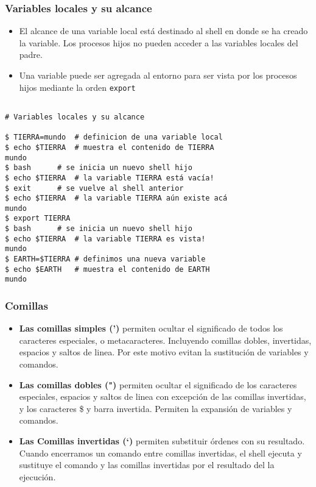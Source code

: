 \documentclass{beamer}
\begin{document}
\begin{frame}{}
\frametitle{Variables locales y su alcance}
\begin{itemize}
\item El alcance de una variable local está destinado al shell en donde se ha creado la variable. Los procesos hijos no pueden acceder a las variables locales del padre.
\item Una variable puede ser agregada al entorno para ser vista por los procesos hijos mediante la orden \texttt{export}
\end{itemize}
\end{frame}{}

\begin{Verbatim}

# Variables locales y su alcance

$ TIERRA=mundo	# definicion de una variable local
$ echo $TIERRA	# muestra el contenido de TIERRA
mundo
$ bash		# se inicia un nuevo shell hijo
$ echo $TIERRA	# la variable TIERRA está vacía!
$ exit		# se vuelve al shell anterior
$ echo $TIERRA	# la variable TIERRA aún existe acá
mundo
$ export TIERRA
$ bash		# se inicia un nuevo shell hijo
$ echo $TIERRA	# la variable TIERRA es vista!
mundo
$ EARTH=$TIERRA	# definimos una nueva variable
$ echo $EARTH	# muestra el contenido de EARTH
mundo
\end{Verbatim}

\begin{frame}{}
\frametitle{Comillas}
\begin{itemize}
\item \textbf{Las comillas simples (')} permiten ocultar el significado de todos los caracteres 
		especiales, o metacaracteres. Incluyendo comillas dobles, 
		invertidas, espacios y saltos de linea. Por este motivo evitan 
		la sustitución de variables y comandos.
\item \textbf{Las comillas dobles (")} permiten ocultar el significado de los caracteres especiales, 
 		espacios y saltos de linea con excepción de las comillas 
 		invertidas, y los caracteres \$ y barra invertida. Permiten la expansión de variables y comandos.
\item
\textbf{Las Comillas invertidas (`)} permiten substituir órdenes con su resultado.
		Cuando encerramos un comando entre comillas invertidas, el shell 
ejecuta y 
		sustituye el comando y las comillas invertidas por el resultado del 
		la ejecución.
\end{itemize}
\end{frame}{}
\end{document}
